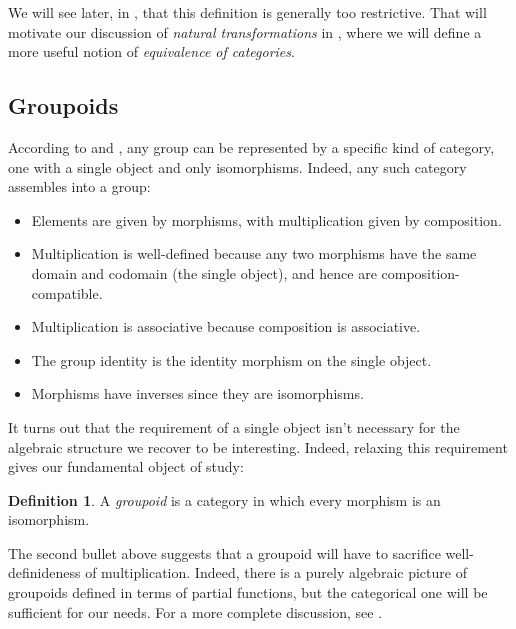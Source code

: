\documentclass[11 pt]{amsart}
\theoremstyle{plain}   %
\theoremstyle{definition}
\newtheorem{defn}{Definition}[section]
\theoremstyle{remark}
\numberwithin{equation}{section}
\begin{document}
We will see later, in , that
this definition is generally too restrictive. That will motivate our discussion of
\emph{natural transformations} in , where we will
define a more useful notion of \emph{equivalence of categories}.

\subsection{Groupoids}\label{sec:groupoids}

According to  and , any group can
be represented by a specific kind of category, one with a single object and only
isomorphisms. Indeed, any such category assembles into a group:

\begin{itemize}
	\item Elements are given by morphisms, with multiplication given by
	      composition.
	\item Multiplication is well-defined because any two morphisms have the same
	      domain and codomain (the single object), and hence are
	      composition-compatible.
	\item Multiplication is associative because composition is associative.
	\item The group identity is the identity morphism on the single object.
	\item Morphisms have inverses since they are isomorphisms.
\end{itemize}

It turns out that the requirement of a single object isn't necessary for the
algebraic structure we recover to be interesting. Indeed, relaxing this
requirement gives our fundamental object of study:

\begin{defn}
	A \emph{groupoid} is a category in which every morphism is an isomorphism.
\end{defn}

The second bullet above suggests that a groupoid will have to sacrifice
well-definideness of multiplication. Indeed, there is a purely algebraic picture
of groupoids defined in terms of partial functions, but the categorical one will
be sufficient for our needs. For a more complete discussion, see \cite{Brown}.
\end{document}

